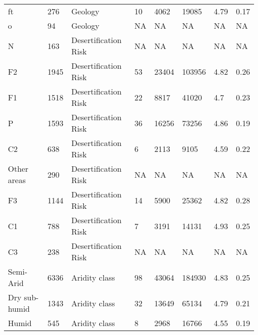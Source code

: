\begin{sidewaystable*}
\begin{tabular*}{\textwidth}{@{\extracolsep{\fill}}llllllll@{\extracolsep{\fill}}}
ft                                              & 276  & Geology              & 10      & 4062           & 19085         & 4.79          & 0.17        \\
o                                               & 94   & Geology              & NA      & NA             & NA            & NA            & NA          \\
N                                               & 163  & Desertification Risk & NA      & NA             & NA            & NA            & NA          \\
F2                                              & 1945 & Desertification Risk & 53      & 23404          & 103956        & 4.82          & 0.26        \\
F1                                              & 1518 & Desertification Risk & 22      & 8817           & 41020         & 4.7           & 0.23        \\
P                                               & 1593 & Desertification Risk & 36      & 16256          & 73256         & 4.86          & 0.19        \\
C2                                              & 638  & Desertification Risk & 6       & 2113           & 9105          & 4.59          & 0.22        \\
Other areas                                     & 290  & Desertification Risk & NA      & NA             & NA            & NA            & NA          \\
F3                                              & 1144 & Desertification Risk & 14      & 5900           & 25362         & 4.82          & 0.28        \\
C1                                              & 788  & Desertification Risk & 7       & 3191           & 14131         & 4.93          & 0.25        \\
C3                                              & 238  & Desertification Risk & NA      & NA             & NA            & NA            & NA          \\
Semi-Arid                                       & 6336 & Aridity class        & 98      & 43064          & 184930        & 4.83          & 0.25        \\
Dry sub-humid                                   & 1343 & Aridity class        & 32      & 13649          & 65134         & 4.79          & 0.21        \\
Humid                                           & 545  & Aridity class        & 8       & 2968           & 16766         & 4.55          & 0.19       
\end{tabular*}
\end{sidewaystable*}


